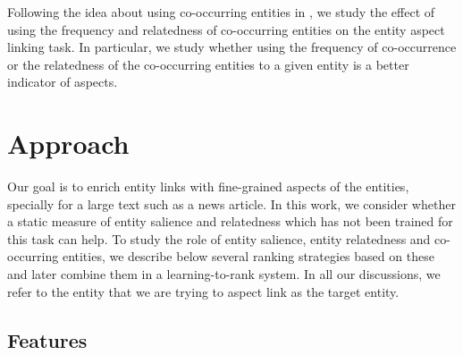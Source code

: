 \documentclass[sigconf,authordraft]{acmart}
\begin{document}
Following the idea about using co-occurring entities in \cite{dalton2014entity, chatterjee2019why}, we study the effect of using the frequency and relatedness of co-occurring entities on the entity aspect linking task. In particular, we study whether using the frequency of co-occurrence or the relatedness of the co-occurring entities to a given entity is a better indicator of aspects.

\section{Approach}
\label{sec:Approach}
Our goal is to enrich entity links with fine-grained aspects of the entities, specially for a large text such as a news article. In this work, we consider whether a static measure of entity salience and relatedness which has not been trained for this task can help. To study the role of entity salience, entity relatedness and co-occurring entities, we describe below several ranking strategies based on these and later combine them in a learning-to-rank system. In all our discussions, we refer to the entity that we are trying to aspect link as the target entity.

\subsection{Features}
\label{subsec:Features}
\end{document}

